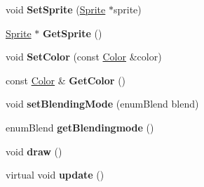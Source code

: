 \begin{DoxyCompactItemize}
void {\bfseries Set\+Sprite} (\mbox{\hyperlink{class_sprite}{Sprite}} $\ast$sprite)
\item 
\mbox{\label{class_game_object_a58483eb15bd91fc2ec516b1e234cd660}} 
\mbox{\hyperlink{class_sprite}{Sprite}} $\ast$ {\bfseries Get\+Sprite} ()
\item 
\mbox{\label{class_game_object_a22b28d62e571844384d6d1a5e6eec7a8}} 
void {\bfseries Set\+Color} (const \mbox{\hyperlink{class_color}{Color}} \&color)
\item 
\mbox{\label{class_game_object_a0a6f875bbb2657a2a0bed2126a84f0b7}} 
const \mbox{\hyperlink{class_color}{Color}} \& {\bfseries Get\+Color} ()
\item 
\mbox{\label{class_game_object_a276120a8b680ba3c6e5e8f459c9fc0f4}} 
void {\bfseries set\+Blending\+Mode} (enum\+Blend blend)
\item 
\mbox{\label{class_game_object_a53e80c55ef5db02d9d70e0487af7464c}} 
enum\+Blend {\bfseries get\+Blendingmode} ()
\item 
\mbox{\label{class_game_object_abb64143e72358beb808db22182517802}} 
void {\bfseries draw} ()
\item 
\mbox{\label{class_game_object_adad7d284b670db722a2fda8e6a7997e3}} 
virtual void {\bfseries update} ()
\end{DoxyCompactItemize}

